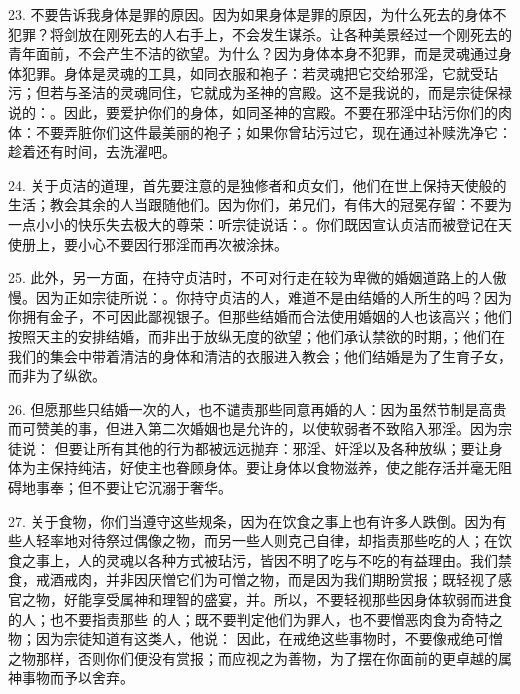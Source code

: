 23. 不要告诉我身体是罪的原因。因为如果身体是罪的原因，为什么死去的身体不犯罪？将剑放在刚死去的人右手上，不会发生谋杀。让各种美景经过一个刚死去的青年面前，不会产生不洁的欲望。为什么？因为身体本身不犯罪，而是灵魂通过身体犯罪。身体是灵魂的工具，如同衣服和袍子：若灵魂把它交给邪淫，它就受玷污；但若与圣洁的灵魂同住，它就成为圣神的宫殿。这不是我说的，而是宗徒保禄说的：。因此，要爱护你们的身体，如同圣神的宫殿。不要在邪淫中玷污你们的肉体：不要弄脏你们这件最美丽的袍子；如果你曾玷污过它，现在通过补赎洗净它：趁着还有时间，去洗濯吧。\par

24. 关于贞洁的道理，首先要注意的是独修者和贞女们，他们在世上保持天使般的生活；教会其余的人当跟随他们。因为你们，弟兄们，有伟大的冠冕存留：不要为一点小小的快乐失去极大的尊荣：听宗徒说话：。你们既因宣认贞洁而被登记在天使册上，要小心不要因行邪淫而再次被涂抹。\par

25. 此外，另一方面，在持守贞洁时，不可对行走在较为卑微的婚姻道路上的人傲慢。因为正如宗徒所说：。你持守贞洁的人，难道不是由结婚的人所生的吗？因为你拥有金子，不可因此鄙视银子。但那些结婚而合法使用婚姻的人也该高兴；他们按照天主的安排结婚，而非出于放纵无度的欲望；他们承认禁欲的时期，；他们在我们的集会中带着清洁的身体和清洁的衣服进入教会；他们结婚是为了生育子女，而非为了纵欲。\par

26. 但愿那些只结婚一次的人，也不谴责那些同意再婚的人：因为虽然节制是高贵而可赞美的事，但进入第二次婚姻也是允许的，以使软弱者不致陷入邪淫。因为宗徒说： 但要让所有其他的行为都被远远抛弃：邪淫、奸淫以及各种放纵；要让身体为主保持纯洁，好使主也眷顾身体。要让身体以食物滋养，使之能存活并毫无阻碍地事奉；但不要让它沉溺于奢华。\par

\par

27. 关于食物，你们当遵守这些规条，因为在饮食之事上也有许多人跌倒。因为有些人轻率地对待祭过偶像之物，而另一些人则克己自律，却指责那些吃的人；在饮食之事上，人的灵魂以各种方式被玷污，皆因不明了吃与不吃的有益理由。我们禁食，戒酒戒肉，并非因厌憎它们为可憎之物，而是因为我们期盼赏报；既轻视了感官之物，好能享受属神和理智的盛宴，并。所以，不要轻视那些因身体软弱而进食的人；也不要指责那些 的人；既不要判定他们为罪人，也不要憎恶肉食为奇特之物；因为宗徒知道有这类人，他说： 因此，在戒绝这些事物时，不要像戒绝可憎之物那样，否则你们便没有赏报；而应视之为善物，为了摆在你面前的更卓越的属神事物而予以舍弃。\par

